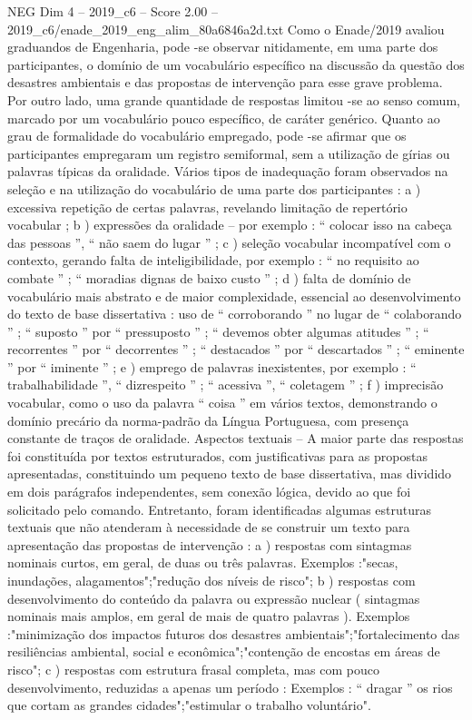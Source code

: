 \begin{textsample}{NEG Dim 4 – 2019\_c6 – Score 2.00 – 2019\_c6/enade\_2019\_eng\_alim\_80a6846a2d.txt}
Como o Enade/2019 avaliou graduandos de Engenharia, pode -se observar nitidamente, em uma parte dos participantes, o domínio de um vocabulário específico na discussão da questão dos desastres ambientais e das propostas de intervenção para esse grave problema.
Por outro lado, uma grande quantidade de respostas limitou -se ao senso comum, marcado por um vocabulário pouco específico, de caráter genérico.
Quanto ao grau de formalidade do vocabulário empregado, pode -se afirmar que os participantes empregaram um registro semiformal, sem a utilização de gírias ou palavras típicas da oralidade.
Vários tipos de inadequação foram observados na seleção e na utilização do vocabulário de uma parte dos participantes : a ) excessiva repetição de certas palavras, revelando limitação de repertório vocabular ; b ) expressões da oralidade – por exemplo : “ colocar isso na cabeça das pessoas ”, “ não saem do lugar ” ; c ) seleção vocabular incompatível com o contexto, gerando falta de inteligibilidade, por exemplo : “ no requisito ao combate ” ; “ moradias dignas de baixo custo ” ; d ) falta de domínio de vocabulário mais abstrato e de maior complexidade, essencial ao desenvolvimento do texto de base dissertativa : uso de “ corroborando ” no lugar de “ colaborando ” ; “ suposto ” por “ pressuposto ” ; “ devemos obter algumas atitudes ” ; “ recorrentes ” por “ decorrentes ” ; “ destacados ” por “ descartados ” ; “ eminente ” por “ iminente ” ; e ) emprego de palavras inexistentes, por exemplo : “ trabalhabilidade ”, “ dizrespeito ” ; “ acessiva ”, “ coletagem ” ; f ) imprecisão vocabular, como o uso da palavra “ coisa ” em vários textos, demonstrando o domínio precário da norma-padrão da Língua Portuguesa, com presença constante de traços de oralidade.
Aspectos textuais – A maior parte das respostas foi constituída por textos estruturados, com justificativas para as propostas apresentadas, constituindo um pequeno texto de base dissertativa, mas dividido em dois parágrafos independentes, sem conexão lógica, devido ao que foi solicitado pelo comando.
Entretanto, foram identificadas algumas estruturas textuais que não atenderam à necessidade de se construir um texto para apresentação das propostas de intervenção : a ) respostas com sintagmas nominais curtos, em geral, de duas ou três palavras.
Exemplos :"secas, inundações, alagamentos";"redução dos níveis de risco"; b ) respostas com desenvolvimento do conteúdo da palavra ou expressão nuclear ( sintagmas nominais mais amplos, em geral de mais de quatro palavras ).
Exemplos :"minimização dos impactos futuros dos desastres ambientais";"fortalecimento das resiliências ambiental, social e econômica";"contenção de encostas em áreas de risco"; c ) respostas com estrutura frasal completa, mas com pouco desenvolvimento, reduzidas a apenas um período : Exemplos : “ dragar ” os rios que cortam as grandes cidades";"estimular o trabalho voluntário".

\end{textsample}
